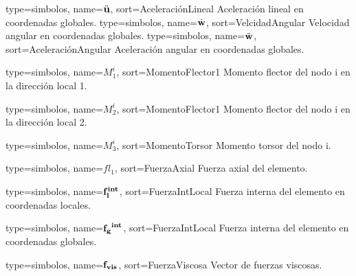 {
	type={simbolos},
	name={$\ddot{\bf{u}}$}, %
	sort={AceleraciónLineal} %
}
{Aceleración lineal en coordenadas globales.}
{
	type={simbolos},
	name={$\dot{\bf{w}}$}, %
	sort={VelcidadAngular} %
}
{Velocidad angular en coordenadas globales.}
{
	type={simbolos},
	name={$\ddot{\bf{w}}$}, %
	sort={AceleraciónAngular} %
}
{Aceleración angular en coordenadas globales.}

{
	type={simbolos},
	name={$M^i_1$}, %
	sort={MomentoFlector1} %
}
{Momento flector del nodo i en la dirección local 1.}


{
	type={simbolos},
	name={$M^i_2$}, %
	sort={MomentoFlector1} %
}
{Momento flector del nodo i en la dirección local 2.}

{
	type={simbolos},
	name={$M^i_3$}, %
	sort={MomentoTorsor} %
}
{Momento torsor del nodo i.}


{
	type={simbolos},
	name={$fl_1$}, %
	sort={FuerzaAxial} %
}
{Fuerza axial del elemento.}

{
	type={simbolos},
	name={$\bf{ f_l^{int}}$}, %
	sort={FuerzaIntLocal} %
}
{Fuerza interna del elemento en coordenadas locales.}

{
	type={simbolos},
	name={$\bf{f_g}^{int}$}, %
	sort={FuerzaIntLocal} %
}
{Fuerza interna del elemento en coordenadas globales.}

{
	type={simbolos},
	name={$\bf{f_{vis}}$}, %
	sort={FuerzaViscosa} %
}
{Vector de fuerzas viscosas.}

